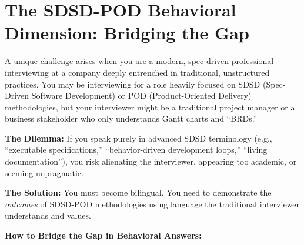 \bigskip

\section{The SDSD-POD Behavioral Dimension: Bridging the
Gap}\label{the-sdsd-pod-behavioral-dimension-bridging-the-gap}

A unique challenge arises when you are a modern, spec-driven
professional interviewing at a company deeply entrenched in traditional,
unstructured practices. You may be interviewing for a role heavily
focused on SDSD (Spec-Driven Software Development) or POD
(Product-Oriented Delivery) methodologies, but your interviewer might be
a traditional project manager or a business stakeholder who only
understands Gantt charts and ``BRDs.''

\textbf{The Dilemma:} If you speak purely in advanced SDSD terminology
(e.g., ``executable specifications,'' ``behavior-driven development
loops,'' ``living documentation''), you risk alienating the interviewer,
appearing too academic, or seeming unpragmatic.

\textbf{The Solution:} You must become bilingual. You need to
demonstrate the \emph{outcomes} of SDSD-POD methodologies using language
the traditional interviewer understands and values.

\textbf{How to Bridge the Gap in Behavioral Answers:}

